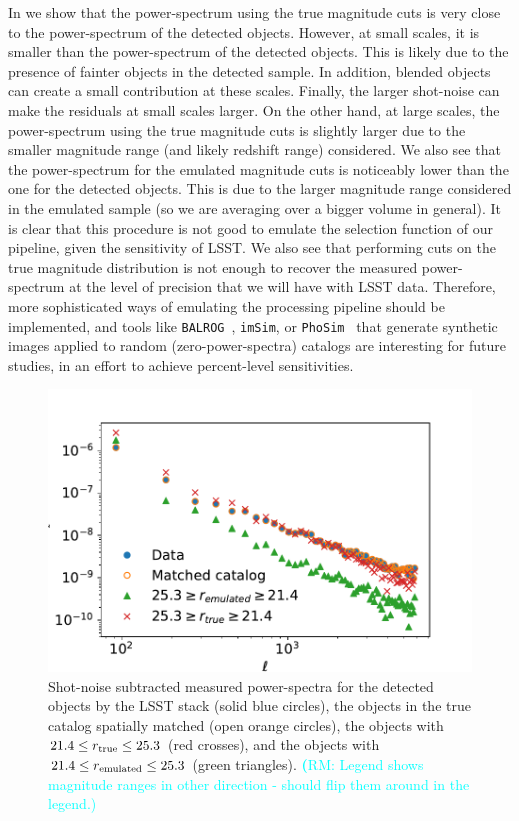 \documentclass[twocolumn]{aastex62}
\newcommand{\rachel}[1]{{\textcolor{cyan}{{\textbf (RM: #1)}}}}
\begin{document}
In  we show that the power-spectrum using the true magnitude cuts is very close to the power-spectrum of the detected objects. However, at small scales, it is smaller than the power-spectrum of the detected objects. This is likely due to the presence of fainter objects in the detected  sample. In addition, blended objects can create a small contribution at these scales. Finally, the larger shot-noise can make the residuals at small scales larger. On the other hand, at large scales, the power-spectrum using the true magnitude cuts is slightly larger due to the smaller magnitude range (and likely redshift range) considered. We also see that the power-spectrum for the emulated magnitude cuts is noticeably lower than the one for the detected objects. This is due to the larger magnitude range considered in the emulated sample (so we are averaging over a bigger volume in general). It is clear that this procedure is not good to emulate the selection function of our pipeline, given the sensitivity of LSST. We also see that performing cuts on the true magnitude distribution is not enough to recover the measured power-spectrum at the level of precision that we will have with LSST data. Therefore, more sophisticated ways of emulating the processing pipeline should be implemented, and tools like \texttt{BALROG}~\citep{2016MNRAS.457..786S}, \texttt{imSim}, or \texttt{PhoSim}~\citep{2015ApJS..218...14P} that generate synthetic images applied to random (zero-power-spectra) catalogs are interesting for future studies, in an effort to achieve percent-level sensitivities.
\begin{figure}
\centering
\includegraphics[width=0.9\columnwidth]{emulated_power_spectra}
\caption{Shot-noise subtracted measured power-spectra for the detected objects by the LSST stack (solid blue circles), the objects in the true catalog spatially matched (open orange circles), the objects with $21.4 \leq r_{\rm true} \leq 25.3$ (red crosses), and the objects with $21.4 \leq r_{\rm emulated} \leq 25.3$ (green triangles). \rachel{Legend shows magnitude ranges in other direction - should flip them around in the legend.}}
\label{fig:emulated_power}
\end{figure}
\end{document}
